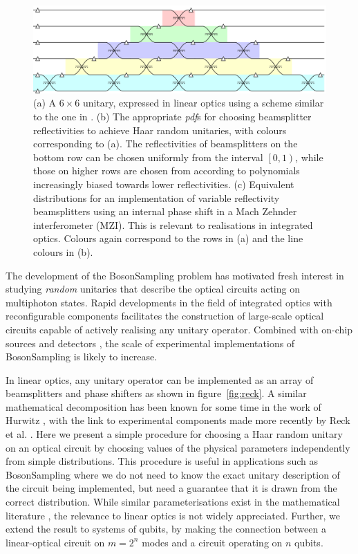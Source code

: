 \documentclass[aps,prl,twocolumn,floatfix]{revtex4}
\newcommand{\by}{\times}
\newcommand{\pdf}{{\it pdf}}
\newcommand{\bosonsampling}{\textsc BosonSampling}
\begin{document}
\begin{figure}[t]
  \includegraphics{figures/example}
  \caption{(a) A \(6 \by 6\) unitary, expressed in linear optics using a scheme
    similar to the one in \cite{re-prl-73-58}. (b) The appropriate \pdf{}s for
    choosing beamsplitter reflectivities to achieve Haar random unitaries, with
    colours corresponding to (a). The reflectivities of beamsplitters on the
    bottom row can be chosen uniformly from the interval \(\left[ 0,1 \right)\),
    while those on higher rows are chosen from according to polynomials
    increasingly biased towards lower reflectivities. (c) Equivalent
    distributions for an implementation of variable reflectivity beamsplitters
    using an internal phase shift in a Mach Zehnder interferometer (MZI). This
    is relevant to realisations in integrated optics. Colours again correspond
    to the rows in (a) and the line colours in (b).}
  \label{fig:example}
\end{figure}

The development of the \bosonsampling{} problem \cite{aa-conf-11-333} has
motivated fresh interest in studying \emph{random} unitaries that describe the
optical circuits acting on multiphoton states. Rapid developments in the field
of integrated optics with reconfigurable components facilitates the construction
of large-scale optical circuits capable of actively realising any unitary
operator. Combined with on-chip sources \cite{si-nphoton-8-104}
and detectors \cite{re-srep-3, pe-ncomm-3-1325}, the scale of experimental
implementations of \bosonsampling{} \cite{cr-nat-7-545, br-sci-339-794,
sp-sci-339-798, ti-nphoton-7-540} is likely to increase.

In linear optics, any unitary operator can be implemented as an array of
beamsplitters and phase shifters as shown in figure~\ref{fig:reck}. A similar
mathematical decomposition has been known for some time in the work of Hurwitz
\cite{hurwitz}, with the link to experimental components made more recently by
Reck et al. \cite{re-prl-73-58}. Here we present a simple procedure for choosing
a Haar random unitary on an optical circuit by choosing values of the physical
parameters independently from simple distributions. This procedure is useful in
applications such as \bosonsampling{} where we do not need to know the exact
unitary description of the circuit being implemented, but need a guarantee that
it is drawn from the correct distribution. While similar parameterisations exist
in the mathematical literature \cite{sp-jmp-53-013501, zy-jpa-27-4235}, the
relevance to linear optics is not widely appreciated. Further, we extend the
result to systems of qubits, by making the connection between a linear-optical
circuit on \(m=2^{n}\) modes and a circuit operating on \(n\) qubits.
\end{document}
